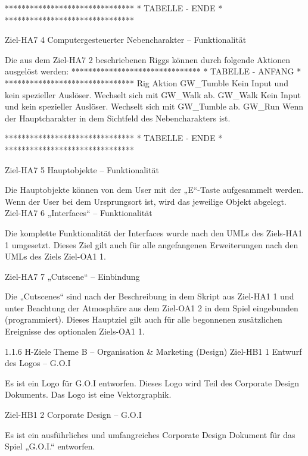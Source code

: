 		 *******************************
		 *  TABELLE - ENDE             *
		 *******************************







Ziel-HA7 4	Computergesteuerter Nebencharakter – Funktionalität

Die aus dem Ziel-HA7 2 beschriebenen Riggs können durch folgende Aktionen ausgelöst werden:
		 *******************************
		 *  TABELLE - ANFANG           *
		 *******************************
Rig	Aktion
GW_Tumble	Kein Input und kein spezieller Auslöser. Wechselt sich mit GW_Walk ab.
GW_Walk	Kein Input und kein spezieller Auslöser. Wechselt sich mit GW_Tumble ab.
GW_Run 	Wenn der Hauptcharakter in dem Sichtfeld des Nebencharakters ist.

		 *******************************
		 *  TABELLE - ENDE             *
		 *******************************







Ziel-HA7 5	Hauptobjekte – Funktionalität

Die Hauptobjekte können von dem User mit der „E“-Taste aufgesammelt werden.  Wenn der User bei dem Ursprungsort ist, wird das jeweilige Objekt abgelegt.
 
Ziel-HA7 6 	„Interfaces“ – Funktionalität

Die komplette Funktionalität der Interfaces wurde nach den UMLs des Ziels-HA1 1 umgesetzt. Dieses Ziel gilt auch für alle angefangenen Erweiterungen nach den UMLs des Ziels Ziel-OA1 1.


Ziel-HA7 7	„Cutscene“ – Einbindung

Die „Cutscenes“ sind nach der Beschreibung in dem Skript aus Ziel-HA1 1 und unter Beachtung der Atmosphäre aus dem Ziel-OA1 2 in dem Spiel eingebunden (programmiert). Dieses Hauptziel gilt auch für alle begonnenen zusätzlichen Ereignisse des optionalen Ziels-OA1 1.

1.1.6	H-Ziele Theme B – Organisation & Marketing (Design)
Ziel-HB1 1	Entwurf des Logos – G.O.I

Es ist ein Logo für G.O.I entworfen. Dieses Logo wird Teil des Corporate Design Dokuments. Das Logo ist eine Vektorgraphik.

Ziel-HB1 2	Corporate Design – G.O.I

Es ist ein ausführliches und umfangreiches Corporate Design Dokument für das Spiel „G.O.I.“ entworfen.



